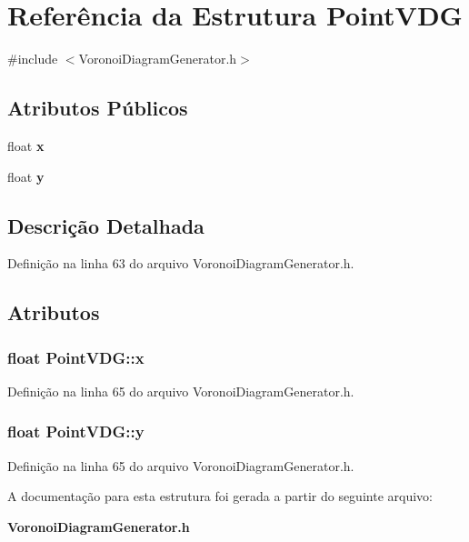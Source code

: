 \section{Referência da Estrutura Point\+V\+DG}
\label{struct_point_v_d_g}


{\ttfamily \#include $<$Voronoi\+Diagram\+Generator.\+h$>$}

\subsection*{Atributos Públicos}
\begin{DoxyCompactItemize}
\item 
float {\bf x}
\item 
float {\bf y}
\end{DoxyCompactItemize}


\subsection{Descrição Detalhada}


Definição na linha 63 do arquivo Voronoi\+Diagram\+Generator.\+h.



\subsection{Atributos}
\subsubsection[{x}]{\setlength{\rightskip}{0pt plus 5cm}float Point\+V\+D\+G\+::x}\label{struct_point_v_d_g_a1a7c038532e9b22afc974523c1d8eb79}


Definição na linha 65 do arquivo Voronoi\+Diagram\+Generator.\+h.

\subsubsection[{y}]{\setlength{\rightskip}{0pt plus 5cm}float Point\+V\+D\+G\+::y}\label{struct_point_v_d_g_ae530a0722fc48805d5034426597241c4}


Definição na linha 65 do arquivo Voronoi\+Diagram\+Generator.\+h.



A documentação para esta estrutura foi gerada a partir do seguinte arquivo\+:\begin{DoxyCompactItemize}
\item 
{\bf Voronoi\+Diagram\+Generator.\+h}\end{DoxyCompactItemize}
